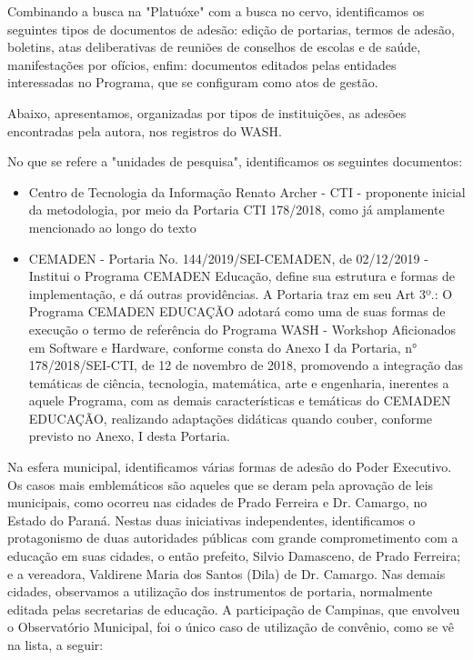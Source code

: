 Combinando a busca na "Platuóxe" com a busca no cervo, identificamos os seguintes tipos de documentos de adesão:  edição de portarias, termos de adesão, boletins, atas deliberativas de reuniões de conselhos de escolas e de saúde, manifestações por ofícios, enfim: documentos editados pelas entidades interessadas no Programa, que se configuram como atos de gestão.

Abaixo, apresentamos, organizadas por tipos de instituições, as adesões encontradas pela autora, nos registros do WASH.

No que se refere a "unidades de pesquisa", identificamos os seguintes documentos:


\begin{itemize}
\item Centro de Tecnologia da Informação Renato Archer - CTI - proponente inicial da metodologia, por meio da Portaria CTI 178/2018, como já amplamente mencionado ao longo do texto
\item CEMADEN - Portaria No. 144/2019/SEI-CEMADEN, de 02/12/2019 - Institui o Programa CEMADEN Educação, define sua estrutura e formas de implementação, e dá outras providências. A Portaria traz em seu Art 3º.: O Programa CEMADEN EDUCAÇÃO adotará como uma de suas formas de execução o termo de referência do Programa WASH - Workshop Aficionados em Software e Hardware, conforme consta do Anexo I da Portaria, n° 178/2018/SEI-CTI, de 12 de novembro de 2018, promovendo a integração das temáticas de ciência, tecnologia, matemática, arte e engenharia, inerentes a aquele Programa, com as demais características e temáticas do CEMADEN EDUCAÇÃO, realizando adaptações didáticas quando couber, conforme previsto no Anexo, I desta Portaria.
\end{itemize}

Na esfera municipal, identificamos  várias formas de adesão do Poder Executivo. Os casos mais emblemáticos são aqueles que se deram pela aprovação de leis municipais, como ocorreu nas cidades de Prado Ferreira e Dr. Camargo, no Estado do Paraná. Nestas duas iniciativas independentes, identificamos o protagonismo de duas autoridades públicas com grande comprometimento com a educação em suas cidades, o então prefeito, Silvio Damasceno, de Prado Ferreira; e a vereadora, Valdirene Maria dos Santos (Dila)  de Dr. Camargo. Nas demais cidades, observamos a utilização dos instrumentos de portaria, normalmente editada pelas secretarias de educação. A participação de Campinas, que envolveu o Observatório Municipal, foi o único caso de utilização de convênio, como se vê na lista, a seguir:


